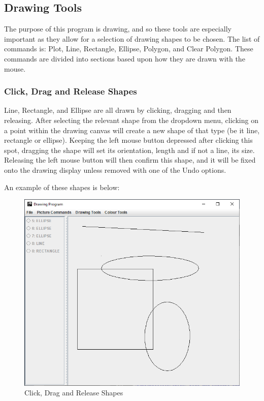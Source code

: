 \documentclass[12pt]{article} %
\begin{document}
\subsection{Drawing Tools}
The purpose of this program is drawing, and so these tools are especially important as they allow for a selection of drawing shapes to be chosen. The list of commands is: Plot, Line, Rectangle, Ellipse, Polygon, and Clear Polygon. These commands are divided into sections based upon how they are drawn with the mouse.

\subsubsection{Click, Drag and Release Shapes} 
Line, Rectangle, and Ellipse are all drawn by clicking, dragging and then releasing. After selecting the relevant shape from the dropdown menu, clicking on a point within the drawing canvas will create a new shape of that type (be it line, rectangle or ellipse). Keeping the left mouse button depressed after clicking this spot, dragging the shape will set its orientation, length and if not a line, its size. Releasing the left mouse button will then confirm this shape, and it will be fixed onto the drawing display unless removed with one of the Undo options.

An example of these shapes is below:
\begin{figure}[H]
\caption{Click, Drag and Release Shapes}
\centering
\includegraphics[scale=0.75]{pictures/clickdragreleaseFirstWindow.PNG}
\end{figure}
\end{document}
